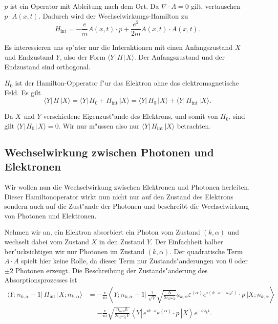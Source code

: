 \begin{refsection}
$p$ ist ein Operator mit Ableitung nach dem Ort. Da $\nabla \cdot A = 0$ gilt, vertauschen $p \cdot A(x, t)$.  Dadurch wird der Wechselwirkungs-Hamilton zu
\begin{equation*}
H_{\text{int}} = -\frac{e}{m} A(x, t) \cdot p + \frac{e^2}{2m}A(x, t) \cdot A(x, t).
\end{equation*}

Es interessieren uns sp"ater nur die Interaktionen mit einen Anfangszustand $X$ und Endzustand $Y$, also der Form $\langle Y| \, H \, |X \rangle$. Der Anfangszustand und der Endzustand sind orthogonal.

$H_0$ ist der Hamilton-Opperator f"ur das Elektron ohne das elektromagnetische Feld. Es gilt
\begin{equation*}
\langle Y| \, H \, |X \rangle = \langle Y| \, H_0 + H_{\text{int}} \, |X \rangle = \langle Y| \, H_0 \, |X \rangle + \langle Y| \, H_{\text{int}} \, |X \rangle.
\end{equation*}

Da $X$ und $Y$ verschiedene Eigenzust"ande des Elektrons, und somit von $H_0$, sind gilt $\langle Y| \, H_0 \, |X \rangle=0$. Wir nur m"ussen also nur $\langle Y| \, H_{\text{int}} \, |X \rangle$ betrachten.

\subsection{Wechselwirkung zwischen Photonen und Elektronen}

Wir wollen nun die Wechselwirkung zwischen Elektronen und Photonen herleiten. Dieser Hamiltonoperator wirkt nun nicht nur auf den Zustand des Elektrons sondern auch auf die Zust"ande der Photonen und beschreibt die Wechselwirkung von Photonen und Elektronen.

Nehmen wir an, ein Elektron absorbiert ein Photon vom Zustand $(k,\alpha)$ und wechselt dabei vom Zustand $X$ in den Zustand $Y$. Der Einfachheit halber ber"ucksichtigen wir nur Photonen im Zustand $(k,\alpha)$. Der quadratische Term $A \cdot A$ spielt hier keine Rolle, da dieser Term nur Zustands"anderungen von $0$ oder $\pm 2$ Photonen erzeugt. Die Beschreibung der Zustands"anderung des Absorptionsprozesses ist
\begin{equation} \label{fq:absorbtion}
\begin{split}
\langle Y; n_{k,\alpha} - 1 |\, H_{\text{int}} \,| X; n_{k,\alpha} \rangle &=
 -\frac{e}{m} \left\langle Y; n_{k,\alpha} - 1 \biggl| 
 \, \frac{1}{\sqrt{V}} \sqrt{\frac{\hbar}{2 \varepsilon_0 \omega_k}}a_{k,\alpha} \varepsilon^{(\alpha)} e^{i(k \cdot x-\omega_k t)} \cdot p \,
\biggl| X; n_{k,\alpha} \right\rangle\\
&= -\frac{e}{m} \sqrt{\frac{n_{k,\alpha} \hbar}{2 \varepsilon_0 \omega_k V}} \left\langle Y \left|
\, e^{ik \cdot x} \varepsilon^{(\alpha)} \cdot p \,
\right| X \right\rangle e^{-i\omega_k t}.
\end{split}
\end{equation}


\end{refsection}

